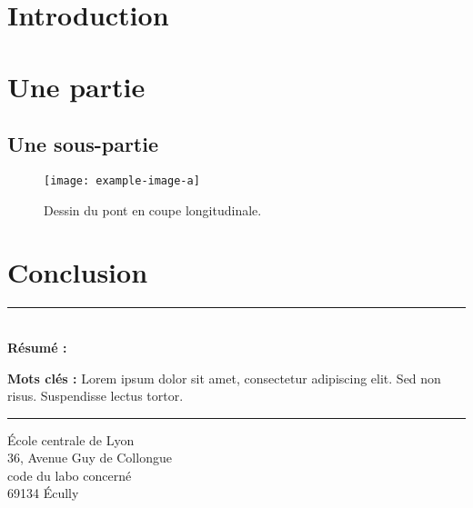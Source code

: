 \documentclass[a4paper,12pt,french]{article}
\begin{document}
\thispagestyle{empty}
\tableofcontents


\section{Introduction}


\newpage
\section{Une partie}

\subsection{Une sous-partie}

\lipsum[1]

\begin{figure}[ht!]
    \centering
    \texttt{[image: example-image-a]}
    \caption{Dessin du pont en coupe longitudinale.}
    \label{fig:coupe-pont}

\end{figure}







\section{Conclusion}




\newpage
\thispagestyle{empty}

\vspace*{\fill}
\noindent\rule[2pt]{\textwidth}{0.5pt}\\
{\textbf{Résumé :}}
\lipsum[1]

{\textbf{Mots clés :}}
Lorem ipsum dolor sit amet, consectetur adipiscing elit. Sed non risus. Suspendisse lectus tortor.
\\
\noindent\rule[2pt]{\textwidth}{0.5pt}
\begin{center}
  École centrale de Lyon\\
  36, Avenue Guy de Collongue\\
  code du labo concerné\\
  69134 Écully
\end{center}
\vspace*{\fill}
\end{document}
